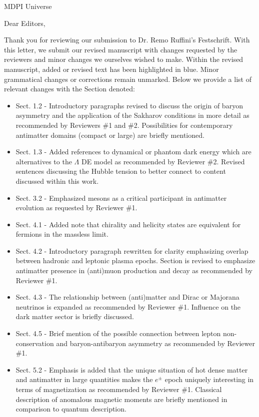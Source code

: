 \documentclass[a4paper, 10pt]{letter}
\begin{document}
\begin{letter}{MDPI Universe}

\opening{Dear Editors,}

Thank you for reviewing our submission to Dr. Remo Ruffini's Festschrift. With this letter, we submit our revised manuscript with changes requested by the reviewers and minor changes we ourselves wished to make. Within the revised manuscript, added or revised text has been highlighted in blue. Minor grammatical changes or corrections remain unmarked. Below we provide a list of relevant changes with the Section denoted:

\begin{itemize}
    \item Sect. 1.2 - Introductory paragraphs revised to discuss the origin of baryon asymmetry and the application of the Sakharov conditions in more detail as recommended by Reviewers \#1 and \#2. Possibilities for contemporary antimatter domains (compact or large) are briefly mentioned.
    \item Sect. 1.3 - Added references to dynamical or phantom dark energy which are alternatives to the $\Lambda$ DE model as recommended by Reviewer \#2. Revised sentences discussing the Hubble tension to better connect to content discussed within this work.
    \item Sect. 3.2 - Emphasized mesons as a critical participant in antimatter evolution as requested by Reviewer \#1.
    \item Sect. 4.1 - Added note that chirality and helicity states are equivalent for fermions in the massless limit.
    \item Sect. 4.2 - Introductory paragraph rewritten for clarity emphasizing overlap between hadronic and leptonic plasma epochs. Section is revised to emphasize antimatter presence in (anti)muon production and decay as recommended by Reviewer \#1.
    \item Sect. 4.3 - The relationship between (anti)matter and Dirac or Majorana neutrinos is expanded as recommended by Reviewer \#1. Influence on the dark matter sector is briefly discussed.
    \item Sect. 4.5 - Brief mention of the possible connection between lepton non-conservation and baryon-antibaryon asymmetry as recommended by Reviewer \#1.
    \item Sect. 5.2 - Emphasis is added that the unique situation of hot dense matter and antimatter in large quantities makes the $e^{\pm}$ epoch uniquely interesting in terms of magnetization as recommended by Reviewer \#1. Classical description of anomalous magnetic moments are briefly mentioned in comparison to quantum description.

\end{itemize}
\end{letter}
\end{document}
